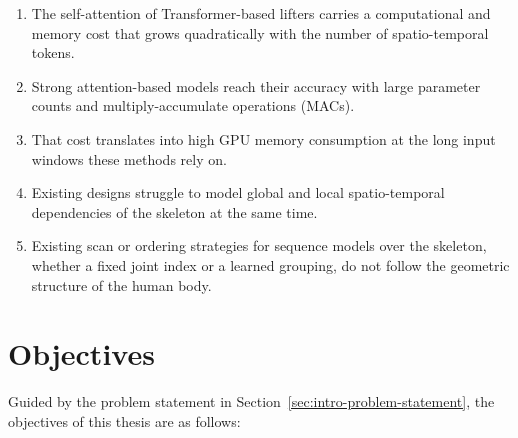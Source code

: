 \begin{enumerate}
  \item The self-attention of Transformer-based lifters carries a
    computational and memory cost that grows quadratically with the number of
    spatio-temporal tokens.
  \item Strong attention-based models reach their accuracy with large
    parameter counts and multiply-accumulate operations (MACs).
  \item That cost translates into high GPU memory consumption at the long
    input windows these methods rely on.
  \item Existing designs struggle to model global and local spatio-temporal
    dependencies of the skeleton at the same time.
  \item Existing scan or ordering strategies for sequence models over the
    skeleton, whether a fixed joint index or a learned grouping, do not follow
    the geometric structure of the human body.
\end{enumerate}

\section{Objectives}
\label{sec:intro-objectives}

Guided by the problem statement in Section~\ref{sec:intro-problem-statement},
the objectives of this thesis are as follows:

